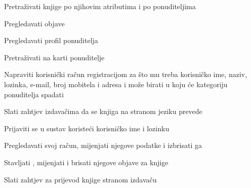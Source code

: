 			
			\begin{packed_enum}

				 \item {}
                
                    				\begin{packed_enum}
                        				\item Pretraživati knjige po njihovim atributima i po ponuditeljima
                        				\item Pregledavati objave
                        				\item Pregledavati profil ponuditelja
					      	\item Pretraživati na karti ponuditelje                      				
                    				\end{packed_enum}
				\item  {}
				
				\begin{packed_enum}
					\item Napraviti korisnički račun registracijom za što mu treba korisničko ime, naziv, lozinka, e-mail, broj mobitela i adresa i može birati u koju će kategoriju ponuditelja spadati
					\item Slati zahtjev izdavačima da se knjiga na stranom jeziku prevede		
				\end{packed_enum}
			
				\item  {} %
				
				\begin{packed_enum}
					
					\item Prijaviti se u sustav koristeći korisničko ime i lozinku
                   				\item Pregledavati svoj račun, mijenjati njegove podatke i izbrisati ga
					\item Stavljati , mijenjati i brisati njegove objave za knjige
					
				\end{packed_enum}

				\item {}

                				\begin{packed_enum}
                    					\item Slati zahtjev za prijevod knjige stranom izdavaču
                				\end{packed_enum}


\end{packed_enum}
